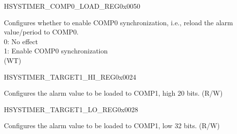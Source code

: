 \begin{register}{H}{SYSTIMER\_COMP0\_LOAD\_REG}{0x0050}\label{regdesc:SYSTIMERCOMP0LOADREG}
%
%
\regnewline%
\begin{regdesc}\begin{reglist}
\label{fielddesc:SYSTIMERTIMERCOMP0LOAD}\item [SYSTIMER\_TIMER\_COMP0\_LOAD] Configures whether to enable COMP0 synchronization, i.e., reload the alarm value/period to COMP0.\\
0: No effect \\
1: Enable COMP0 synchronization\\
 (WT)
\end{reglist}\end{regdesc}
\end{register}


\begin{register}{H}{SYSTIMER\_TARGET1\_HI\_REG}{0x0024}\label{regdesc:SYSTIMERTARGET1HIREG}
%
%
\regnewline%
\begin{regdesc}\begin{reglist}
\label{fielddesc:SYSTIMERTIMERTARGET1HI}\item [SYSTIMER\_TIMER\_TARGET1\_HI] Configures the alarm value to be loaded to COMP1, high 20 bits. (R/W)
\end{reglist}\end{regdesc}
\end{register}


\begin{register}{H}{SYSTIMER\_TARGET1\_LO\_REG}{0x0028}\label{regdesc:SYSTIMERTARGET1LOREG}
%
\regnewline%
\begin{regdesc}\begin{reglist}
\label{fielddesc:SYSTIMERTIMERTARGET1LO}\item [SYSTIMER\_TIMER\_TARGET1\_LO] Configures the alarm value to be loaded to COMP1, low 32 bits. (R/W)
\end{reglist}\end{regdesc}
\end{register}


